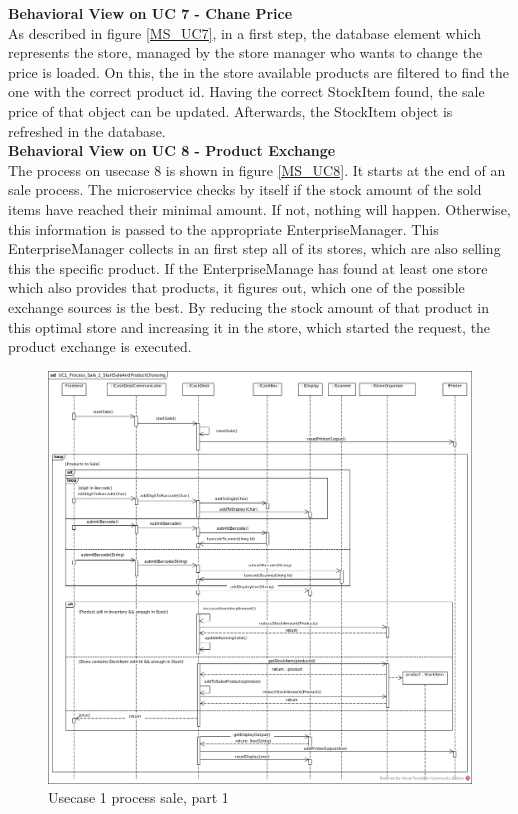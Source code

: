 		\textbf{Behavioral View on UC 7 - Chane Price} \\
		As described in figure \ref{MS_UC7}, in a first step, the database element which represents the store, managed by the store manager who wants to change the price is loaded. On this, the in the store available products are filtered to find the one with the correct product id. 
		Having the correct StockItem found, the sale price of that object can be updated. Afterwards, the StockItem object is refreshed in the database.\\
		
		\textbf{Behavioral View on UC 8 - Product Exchange} \\
		The process on usecase 8 is shown in figure \ref{MS_UC8}. It starts at the end of an sale process. The microservice checks by itself if the stock amount of the sold items have reached their minimal amount. If not, nothing will happen. Otherwise, this information is passed to the appropriate EnterpriseManager. 
		This EnterpriseManager collects in an first step all of its stores, which are also selling this the specific product.
		If the EnterpriseManage has found at least one store which also provides that products, it figures out, which one of the possible exchange sources is the best. By reducing the stock amount of that product in this optimal store and increasing it in the store, which started the request, the product exchange is executed.
		
			\begin{figure}[!h]
				\centering
				\includegraphics[width = 1\textwidth]{img/UC1_Process_Sale_1_StartSaleAndProductChoosing.jpg}
				\caption{Usecase 1 process sale, part 1}
				\label{MS_UC1_1}
			\end{figure}
			
